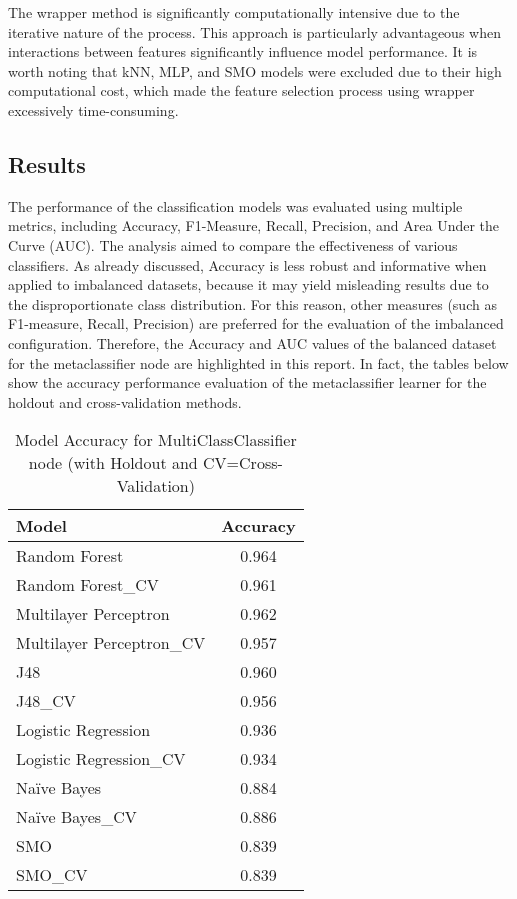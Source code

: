 The wrapper method is significantly computationally intensive due to the iterative nature of the process. This approach is particularly advantageous when interactions between features significantly influence model performance. It is worth noting that kNN, MLP, and SMO models were excluded due to their high computational cost, which made the feature selection process using wrapper excessively time-consuming.
\subsection{Results}
The performance of the classification models was evaluated using multiple metrics, including Accuracy, F1-Measure, Recall, Precision, and Area Under the Curve (AUC). The analysis aimed to compare the effectiveness of various classifiers. 
As already discussed, Accuracy is less robust and informative when applied to imbalanced datasets, because it may yield misleading results due to the disproportionate class distribution. For this reason, other measures (such as F1-measure, Recall, Precision) are preferred for the evaluation of the imbalanced configuration. 
Therefore, the Accuracy and AUC values of the balanced dataset for the metaclassifier node are highlighted in this report. In fact, the tables below show the accuracy performance evaluation of the metaclassifier learner for the holdout and cross-validation methods. 
\begin{table}[H]
\centering
\label{tab:without_cv}
\begin{tabular}{|l|c|}
\hline
\textbf{Model} & \textbf{Accuracy} \\ \hline
Random Forest & 0.964 \\ \hline
Random Forest\_CV & 0.961 \\ \hline
Multilayer Perceptron & 0.962 \\ \hline
Multilayer Perceptron\_CV & 0.957 \\ \hline
J48 & 0.960 \\ \hline
J48\_CV & 0.956 \\ \hline
Logistic Regression & 0.936 \\ \hline
Logistic Regression\_CV & 0.934 \\ \hline
Naïve Bayes& 0.884 \\ \hline
Naïve Bayes\_CV & 0.886 \\ \hline
SMO & 0.839 \\ \hline
SMO\_CV & 0.839 \\ \hline
\end{tabular}
\caption{Model Accuracy for MultiClassClassifier node (with Holdout and CV=Cross-Validation)}
\end{table}

